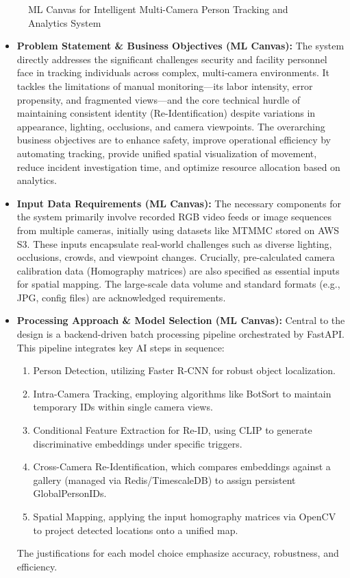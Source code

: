 \begin{figure}[!htb]
    \centering
    \caption{ML Canvas for Intelligent Multi-Camera Person Tracking and Analytics System}
    \label{fig:ml_canvas}
\end{figure}
\begin{itemize}
    \item \textbf{Problem Statement \& Business Objectives (ML Canvas):}
        The system directly addresses the significant challenges security and facility personnel face in tracking individuals across complex, multi-camera environments. It tackles the limitations of manual monitoring—its labor intensity, error propensity, and fragmented views—and the core technical hurdle of maintaining consistent identity (Re-Identification) despite variations in appearance, lighting, occlusions, and camera viewpoints. The overarching business objectives are to enhance safety, improve operational efficiency by automating tracking, provide unified spatial visualization of movement, reduce incident investigation time, and optimize resource allocation based on analytics.

    \item \textbf{Input Data Requirements (ML Canvas):}
        The necessary components for the system primarily involve recorded RGB video feeds or image sequences from multiple cameras, initially using datasets like MTMMC stored on AWS S3. These inputs encapsulate real-world challenges such as diverse lighting, occlusions, crowds, and viewpoint changes. Crucially, pre-calculated camera calibration data (Homography matrices) are also specified as essential inputs for spatial mapping. The large-scale data volume and standard formats (e.g., JPG, config files) are acknowledged requirements.

    \item \textbf{Processing Approach \& Model Selection (ML Canvas):}
        Central to the design is a backend-driven batch processing pipeline orchestrated by FastAPI. This pipeline integrates key AI steps in sequence:
        \begin{enumerate}[label=(\Alph*)]
            \item Person Detection, utilizing Faster R-CNN for robust object localization.
            \item Intra-Camera Tracking, employing algorithms like BotSort to maintain temporary IDs within single camera views.
            \item Conditional Feature Extraction for Re-ID, using CLIP to generate discriminative embeddings under specific triggers.
            \item Cross-Camera Re-Identification, which compares embeddings against a gallery (managed via Redis/TimescaleDB) to assign persistent GlobalPersonIDs.
            \item Spatial Mapping, applying the input homography matrices via OpenCV to project detected locations onto a unified map.
        \end{enumerate}
        The justifications for each model choice emphasize accuracy, robustness, and efficiency.


\end{itemize}
